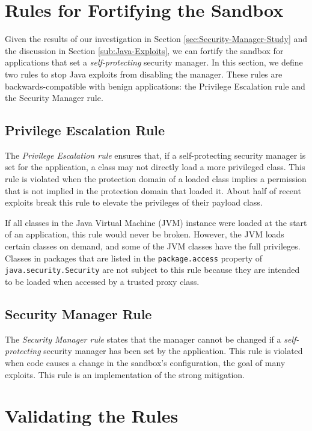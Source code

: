 \documentclass{sig-alternate}
\begin{document}
\section{Rules for Fortifying the Sandbox}\label{sec:Rules-for-Fortifying}

Given the results of our investigation in Section \ref{sec:Security-Manager-Study}
and the discussion in Section \ref{sub:Java-Exploits}, we can fortify
the sandbox for applications that set a \emph{self-protecting} security
manager. In this section, we define two rules to stop Java exploits
from disabling the manager. These rules are backwards-compatible with
benign applications: the Privilege Escalation rule and the Security
Manager rule. 

\subsection{Privilege Escalation Rule}

The \textit{Privilege Escalation rule} ensures that, if a self-protecting
security manager is set for the application, a class may not directly
load a more privileged class. This rule is violated when the protection
domain of a loaded class implies a permission that is not implied
in the protection domain that loaded it. About half of recent exploits
break this rule to elevate the privileges of their payload class.

If all classes in the Java Virtual Machine (JVM) instance were loaded
at the start of an application, this rule would never be broken. However,
the JVM loads certain classes on demand, and some of the JVM classes
have the full privileges. Classes in
packages that are listed in the \texttt{package.access} property of
\texttt{java.security.Security} are not subject to this rule because they are intended to be
loaded when accessed by a trusted proxy class. 

\subsection{Security Manager Rule}

The \textit{Security Manager rule} states that the manager cannot
be changed if a \emph{self-protecting} security manager has been set
by the application. This rule is violated when code causes a change
in the sandbox's configuration, the goal of many exploits. This rule
is an implementation of the strong mitigation.

\section{Validating the Rules}\label{sec:Mitigations}
\end{document}
